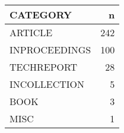 
\begin{tabular}{lr}
\toprule
CATEGORY & n\\
\midrule
ARTICLE & 242\\
INPROCEEDINGS & 100\\
TECHREPORT & 28\\
INCOLLECTION & 5\\
BOOK & 3\\
\addlinespace
MISC & 1\\
\bottomrule
\end{tabular}